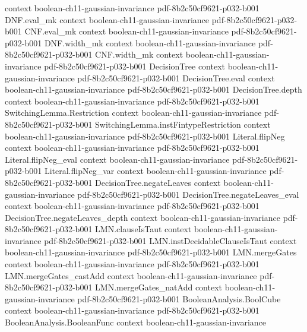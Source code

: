 \begin{theorem}
  {context}
  {boolean-ch11-gaussian-invariance}
  {pdf-8b2c50cf9621-p032-b001}
\proofstep
  {DNF.eval_mk}
  {context}
  {boolean-ch11-gaussian-invariance}
  {pdf-8b2c50cf9621-p032-b001}
\proofstep
  {CNF.eval_mk}
  {context}
  {boolean-ch11-gaussian-invariance}
  {pdf-8b2c50cf9621-p032-b001}
\proofstep
  {DNF.width_mk}
  {context}
  {boolean-ch11-gaussian-invariance}
  {pdf-8b2c50cf9621-p032-b001}
\proofstep
  {CNF.width_mk}
  {context}
  {boolean-ch11-gaussian-invariance}
  {pdf-8b2c50cf9621-p032-b001}
\proofstep
  {DecisionTree}
  {context}
  {boolean-ch11-gaussian-invariance}
  {pdf-8b2c50cf9621-p032-b001}
\proofstep
  {DecisionTree.eval}
  {context}
  {boolean-ch11-gaussian-invariance}
  {pdf-8b2c50cf9621-p032-b001}
\proofstep
  {DecisionTree.depth}
  {context}
  {boolean-ch11-gaussian-invariance}
  {pdf-8b2c50cf9621-p032-b001}
\proofstep
  {SwitchingLemma.Restriction}
  {context}
  {boolean-ch11-gaussian-invariance}
  {pdf-8b2c50cf9621-p032-b001}
\proofstep
  {SwitchingLemma.instFintypeRestriction}
  {context}
  {boolean-ch11-gaussian-invariance}
  {pdf-8b2c50cf9621-p032-b001}
\proofstep
  {Literal.flipNeg}
  {context}
  {boolean-ch11-gaussian-invariance}
  {pdf-8b2c50cf9621-p032-b001}
\proofstep
  {Literal.flipNeg_eval}
  {context}
  {boolean-ch11-gaussian-invariance}
  {pdf-8b2c50cf9621-p032-b001}
\proofstep
  {Literal.flipNeg_var}
  {context}
  {boolean-ch11-gaussian-invariance}
  {pdf-8b2c50cf9621-p032-b001}
\proofstep
  {DecisionTree.negateLeaves}
  {context}
  {boolean-ch11-gaussian-invariance}
  {pdf-8b2c50cf9621-p032-b001}
\proofstep
  {DecisionTree.negateLeaves_eval}
  {context}
  {boolean-ch11-gaussian-invariance}
  {pdf-8b2c50cf9621-p032-b001}
\proofstep
  {DecisionTree.negateLeaves_depth}
  {context}
  {boolean-ch11-gaussian-invariance}
  {pdf-8b2c50cf9621-p032-b001}
\proofstep
  {LMN.clauseIsTaut}
  {context}
  {boolean-ch11-gaussian-invariance}
  {pdf-8b2c50cf9621-p032-b001}
\proofstep
  {LMN.instDecidableClauseIsTaut}
  {context}
  {boolean-ch11-gaussian-invariance}
  {pdf-8b2c50cf9621-p032-b001}
\proofstep
  {LMN.mergeGates}
  {context}
  {boolean-ch11-gaussian-invariance}
  {pdf-8b2c50cf9621-p032-b001}
\proofstep
  {LMN.mergeGates_castAdd}
  {context}
  {boolean-ch11-gaussian-invariance}
  {pdf-8b2c50cf9621-p032-b001}
\proofstep
  {LMN.mergeGates_natAdd}
  {context}
  {boolean-ch11-gaussian-invariance}
  {pdf-8b2c50cf9621-p032-b001}
\proofstep
  {BooleanAnalysis.BoolCube}
  {context}
  {boolean-ch11-gaussian-invariance}
  {pdf-8b2c50cf9621-p032-b001}
\proofstep
  {BooleanAnalysis.BooleanFunc}
  {context}
  {boolean-ch11-gaussian-invariance}

\end{theorem}
